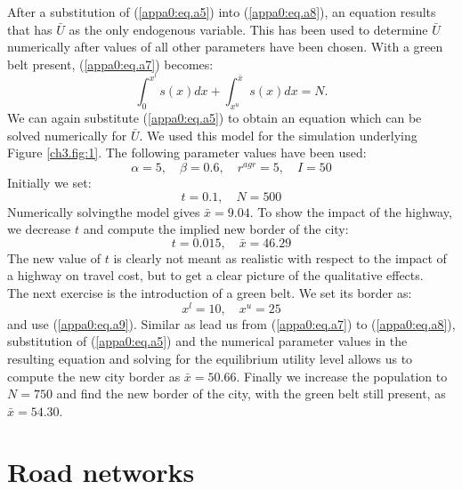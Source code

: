 \documentclass[a4paper,authoryear,review]{elsarticle}  	%
\begin{document}
	After a substitution of (\ref{appa0:eq.a5}) into (\ref{appa0:eq.a8}), an equation results that has $\bar{U}$ as the only endogenous variable. This has been used to determine $\bar{U}$ numerically after values of all other parameters have been chosen. 
	With a green belt present, (\ref{appa0:eq.a7}) becomes:
	\begin{equation}\label{appa0:eq.a9}
		\int_{0}^{x^l}{s(x)}dx + \int_{x^u}^{\bar{x}}{s(x)}dx = N.
	\end{equation}
	We can again substitute (\ref{appa0:eq.a5}) to obtain an equation which can be solved numerically for $\bar{U}$.
	We used this model for the simulation underlying Figure \ref{ch3.fig:1}. The following parameter values have been used:
	\begin{equation}\label{appa0:eq.a10}
		\alpha = 5, \quad  \beta = 0.6, \quad r^{agr} = 5, \quad I = 50
	\end{equation}
	Initially we set:
	\begin{equation}\label{appa0:eq.a11}
		t = 0.1, \quad N = 500
	\end{equation}
	Numerically solvingthe model gives $\bar{x} = 9.04$. To show the impact of the highway, we decrease $t$ and compute the implied new border of the city:
	\begin{equation}\label{appa0:eq.a12}
		t = 0.015, \quad \bar{x} = 46.29
	\end{equation}
	The new value of $t$ is clearly not meant as realistic with respect to the impact of a highway on travel cost, but to get a clear picture of the qualitative effects.\\
	The next exercise is the introduction of a green belt. We set its border as:
	\begin{equation}\label{appa0:eq.a13}
		x^l = 10, \quad x^u = 25
	\end{equation}
	and use (\ref{appa0:eq.a9}). Similar as lead us from (\ref{appa0:eq.a7}) to (\ref{appa0:eq.a8}), substitution of (\ref{appa0:eq.a5}) and the numerical parameter values in the resulting equation and solving for the equilibrium utility level allows us to compute the new city border as $\bar{x} = 50.66$. Finally we increase the population to $N = 750$ and find the new border of the city, with the green belt still present, as $\bar{x} = 54.30$.

\newpage	
\section[Appendix B]{Road networks}\label{appa}
\end{document}
